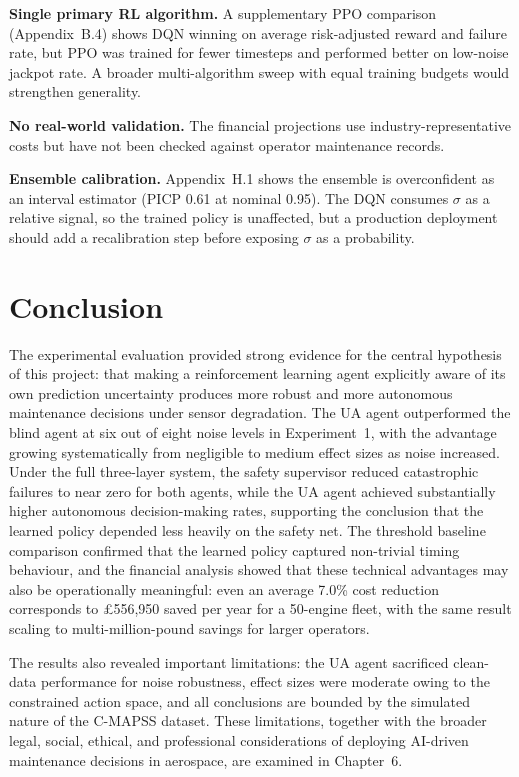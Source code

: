 \documentclass[12pt,a4paper]{report}
\begin{document}
\textbf{Single primary RL algorithm.} A supplementary PPO comparison (Appendix~B.4) shows DQN winning on average risk-adjusted reward and failure rate, but PPO was trained for fewer timesteps and performed better on low-noise jackpot rate. A broader multi-algorithm sweep with equal training budgets would strengthen generality.

\textbf{No real-world validation.} The financial projections use industry-representative costs but have not been checked against operator maintenance records.

\textbf{Ensemble calibration.} Appendix~H.1 shows the ensemble is overconfident as an interval estimator (PICP 0.61 at nominal 0.95). The DQN consumes $\sigma$ as a relative signal, so the trained policy is unaffected, but a production deployment should add a recalibration step before exposing $\sigma$ as a probability.

\section{Conclusion}

The experimental evaluation provided strong evidence for the central hypothesis of this project: that making a reinforcement learning agent explicitly aware of its own prediction uncertainty produces more robust and more autonomous maintenance decisions under sensor degradation. The UA agent outperformed the blind agent at six out of eight noise levels in Experiment~1, with the advantage growing systematically from negligible to medium effect sizes as noise increased. Under the full three-layer system, the safety supervisor reduced catastrophic failures to near zero for both agents, while the UA agent achieved substantially higher autonomous decision-making rates, supporting the conclusion that the learned policy depended less heavily on the safety net. The threshold baseline comparison confirmed that the learned policy captured non-trivial timing behaviour, and the financial analysis showed that these technical advantages may also be operationally meaningful: even an average 7.0\% cost reduction corresponds to \pounds556,950 saved per year for a 50-engine fleet, with the same result scaling to multi-million-pound savings for larger operators.


The results also revealed important limitations: the UA agent sacrificed clean-data performance for noise robustness, effect sizes were moderate owing to the constrained action space, and all conclusions are bounded by the simulated nature of the C-MAPSS dataset. These limitations, together with the broader legal, social, ethical, and professional considerations of deploying AI-driven maintenance decisions in aerospace, are examined in Chapter~6.
\end{document}
